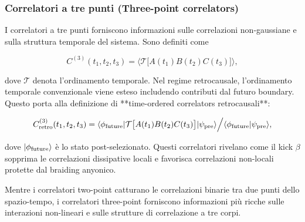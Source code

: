 \documentclass[11pt,a4paper]{article}
\theoremstyle{plain}
\theoremstyle{definition}
\begin{document}
\vspace{0.4cm}

\subsubsection{Correlatori a tre punti (Three-point correlators)}

\vspace{0.2cm}

I correlatori a tre punti forniscono informazioni sulle correlazioni non-gaussiane e sulla struttura temporale del sistema. Sono definiti come


\vspace{0.2cm}
\begin{equation}
C^{(3)}(t_1,t_2,t_3) = \langle \mathcal{T} \bigl[ A(t_1) B(t_2) C(t_3) \bigr] \rangle,
\label{eq:three_point}
\end{equation}


\vspace{0.3cm}
dove $\mathcal{T}$ denota l’ordinamento temporale. Nel regime retrocausale, l’ordinamento temporale convenzionale viene esteso includendo contributi dal futuro boundary. Questo porta alla definizione di **time-ordered correlators retrocausali**:



\vspace{0.2cm}
\begin{equation}
C^{(3)}_{\rm retro}(t_1,t_2,t_3) = \langle \phi_{\rm future} | \mathcal{T} \bigl[ A(t_1) B(t_2) C(t_3) \bigr] | \psi_{\rm pre} \rangle \Big/ \langle \phi_{\rm future} | \psi_{\rm pre} \rangle,
\label{eq:three_point_retro}
\end{equation}



\vspace{0.3cm}
dove $|\phi_{\rm future}\rangle$ è lo stato post-selezionato. Questi correlatori rivelano come il kick $\beta$ sopprima le correlazioni dissipative locali e favorisca correlazioni non-locali protette dal braiding anyonico.


\vspace{0.4cm}




Mentre i correlatori two-point catturano le correlazioni binarie tra due punti dello spazio-tempo, i correlatori three-point forniscono informazioni più ricche sulle interazioni non-lineari e sulle strutture di correlazione a tre corpi. 


\vspace{0.2cm}
\end{document}
